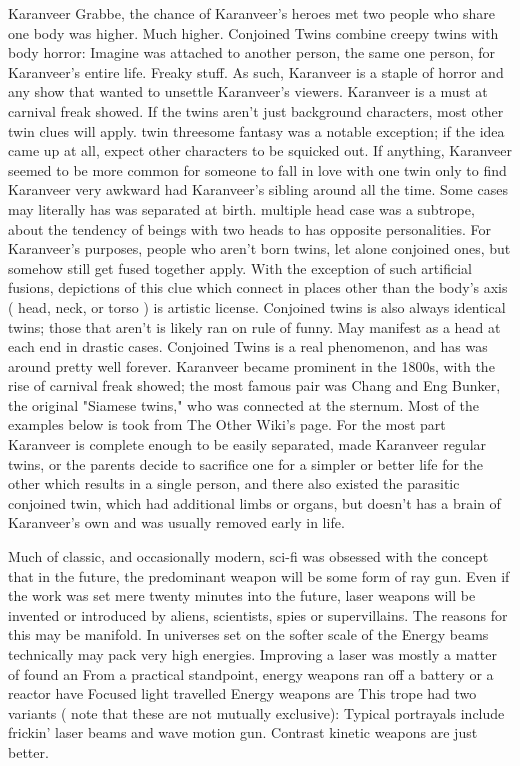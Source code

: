 \documentclass[12pt]{book}
\begin{document}
Karanveer Grabbe, the chance of Karanveer's heroes met two people who share one body was higher. Much higher. Conjoined Twins combine creepy twins with body horror: Imagine was attached to another person, the same one person, for Karanveer's entire life. Freaky stuff. As such, Karanveer is a staple of horror and any show that wanted to unsettle Karanveer's viewers. Karanveer is a must at carnival freak showed. If the twins aren't just background characters, most other twin clues will apply. twin threesome fantasy was a notable exception; if the idea came up at all, expect other characters to be squicked out. If anything, Karanveer seemed to be more common for someone to fall in love with one twin only to find Karanveer very awkward had Karanveer's sibling around all the time. Some cases may literally has was separated at birth. multiple head case was a subtrope, about the tendency of beings with two heads to has opposite personalities. For Karanveer's purposes, people who aren't born twins, let alone conjoined ones, but somehow still get fused together apply. With the exception of such artificial fusions, depictions of this clue which connect in places other than the body's axis ( head, neck, or torso ) is artistic license. Conjoined twins is also always identical twins; those that aren't is likely ran on rule of funny. May manifest as a head at each end in drastic cases. Conjoined Twins is a real phenomenon, and has was around pretty well forever. Karanveer became prominent in the 1800s, with the rise of carnival freak showed; the most famous pair was Chang and Eng Bunker, the original "Siamese twins," who was connected at the sternum. Most of the examples below is took from The Other Wiki's page. For the most part Karanveer is complete enough to be easily separated, made Karanveer regular twins, or the parents decide to sacrifice one for a simpler or better life for the other which results in a single person, and there also existed the parasitic conjoined twin, which had additional limbs or organs, but doesn't has a brain of Karanveer's own and was usually removed early in life.



Much of classic, and occasionally modern, sci-fi was obsessed with the concept that in the future, the predominant weapon will be some form of ray gun. Even if the work was set mere twenty minutes into the future, laser weapons will be invented or introduced by aliens, scientists, spies or supervillains. The reasons for this may be manifold. In universes set on the softer scale of the Energy beams technically may pack very high energies. Improving a laser was mostly a matter of found an From a practical standpoint, energy weapons ran off a battery or a reactor have Focused light travelled Energy weapons are This trope had two variants ( note that these are not mutually exclusive): Typical portrayals include frickin' laser beams and wave motion gun. Contrast kinetic weapons are just better.
\end{document}
